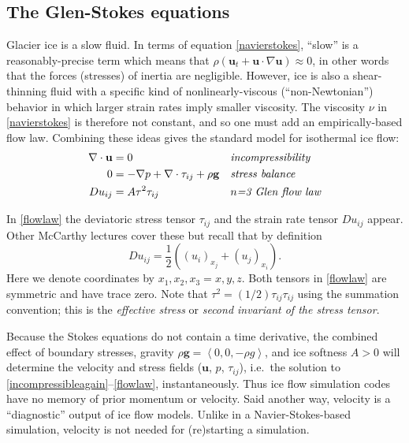 \documentclass[letterpaper,final,12pt,reqno]{amsart}
\newcommand{\bu}{\mathbf{u}}
\begin{document}
\subsection*{The Glen-Stokes equations}  Glacier ice is a slow fluid.  In terms of equation \eqref{navierstokes}, ``slow'' is a reasonably-precise term which means that $\rho \left(\mathbf{u}_t + \mathbf{u}\cdot\nabla \mathbf{u}\right) \approx 0$, in other words that the forces (stresses) of inertia are negligible.  However, ice is also a shear-thinning fluid with a specific kind of nonlinearly-viscous (``non-Newtonian'') behavior in which larger strain rates imply smaller viscosity.  The viscosity $\nu$ in \eqref{navierstokes} is therefore not constant, and so one must add an empirically-based flow law.  Combining these ideas gives the standard model for isothermal ice flow:
\begin{align}
\nabla \cdot \mathbf{u} &= 0 &&\text{\emph{incompressibility}} \label{incompressibleagain} \\
0 &= - \nabla p + \nabla \cdot \tau_{ij} + \rho \mathbf{g} &&\text{\emph{stress balance}} \label{forcebalance} \\
Du_{ij} &= A \tau^2 \tau_{ij} &&\text{\emph{$n$=3 Glen flow law}} \label{flowlaw}
\end{align}

In \eqref{flowlaw} the deviatoric stress tensor $\tau_{ij}$ and the strain rate tensor $Du_{ij}$ appear.  Other McCarthy lectures cover these but recall that by definition
    $$Du_{ij} = \frac{1}{2} \left((u_i)_{x_j}+(u_j)_{x_i}\right).$$
Here we denote coordinates by $x_1,x_2,x_3=x,y,z$.  Both tensors in \eqref{flowlaw} are symmetric and have trace zero.  Note that $\tau^2 = (1/2) \tau_{ij} \tau_{ij}$ using the summation convention; this is the \emph{effective stress} or \emph{second invariant of the stress tensor}.

Because the Stokes equations do not contain a time derivative, the combined effect of boundary stresses, gravity $\rho \mathbf{g} = \left<0,0,-\rho g\right>$, and ice softness $A>0$ will determine the velocity and stress fields ($\bu$, $p$, $\tau_{ij}$), i.e.~the solution to \eqref{incompressibleagain}--\eqref{flowlaw}, instantaneously.  Thus ice flow simulation codes have no memory of prior momentum or velocity.  Said another way, velocity is a ``diagnostic'' output of ice flow models.  Unlike in a Navier-Stokes-based simulation, velocity is not needed for (re)starting a simulation.
\end{document}
